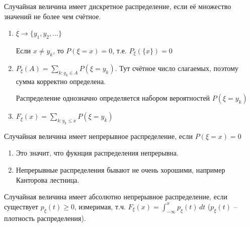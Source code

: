 \begin{definition}
    Случайная величина имеет дискретное распределение, если её 
    множество значений не более чем счётное.

    \begin{remark}
        \begin{enumerate}
            \item { $\xi \to \{y_1, y_2, \ldots \}$

            Если $x \neq y_k$, то $P(\xi = x) = 0$, т.е. $P_{\xi}(\{ x \}) = 0$
            }

            \item { $P_{\xi} (A) = \sum_{k : y_k \in A} P(\xi = y_k)$. Тут счётное
            число слагаемых, поэтому сумма корректно определена.
    
            Распределение однозначно определяется набором вероятностей $P(\xi = y_k)$
            }
            \item {
                $F_{\xi} (x) = \sum_{k : y_k \leqslant x} P(\xi = y_k)$
            }
        \end{enumerate}
    \end{remark}
\end{definition}

\begin{definition}
    Случайная величина имеет непрерывное распределение, если 
    $P(\xi = x) = 0$

    \begin{remark}
        \begin{enumerate}
            \item {
                Это значит, что фукнция распределения непрерывна.
            }
            \item {
                Непрерывные распределения бывают не очень хорошими, например
                Канторова лестница.
            }
        \end{enumerate}
    \end{remark}
\end{definition}

\begin{definition}
    Случайная величина имеет абсолютно непрерывное распределение, если 
    существует $p_{\xi} (t) \geqslant 0$, измеримая, т.ч. $F_{\xi} (x) = 
    \int_{-\infty}^x p_{\xi} (t) \, dt$ ($p_{\xi}(t)$ -- плотность распределения).
\end{definition}

